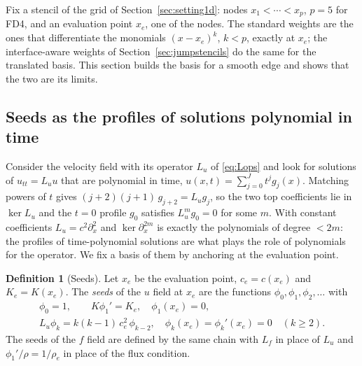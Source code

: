 \documentclass[11pt]{amsart}
\theoremstyle{definition}
\newtheorem{definition}[theorem]{Definition}
\theoremstyle{remark}
\newcommand{\Lu}{L_u}
\newcommand{\Lf}{L_f}
\newcommand{\px}{\partial_x}
\begin{document}
Fix a stencil of the grid of Section~\ref{sec:setting1d}: nodes
$x_1 < \cdots < x_p$, $p = 5$ for FD4, and an evaluation point $x_e$,
one of the nodes. The standard weights are the ones that differentiate
the monomials $(x - x_e)^k$, $k < p$, exactly at $x_e$; the
interface-aware weights of Section~\ref{sec:jumpstencils} do the same
for the translated basis. This section builds the basis for a smooth
edge and shows that the two are its limits.

\subsection{Seeds as the profiles of solutions polynomial in time}
\label{sec:chain}
Consider the velocity field with its operator $\Lu$ of \eqref{eq:Lops}
and look for solutions of $u_{tt} = \Lu u$ that are polynomial in time,
$u(x, t) = \sum_{j = 0}^{J} t^j g_j(x)$. Matching powers of $t$ gives
$(j + 2)(j + 1)\, g_{j+2} = \Lu g_j$, so the two top coefficients lie in
$\ker \Lu$ and the $t = 0$ profile $g_0$ satisfies $\Lu^m g_0 = 0$ for
some $m$. With constant coefficients $\Lu = c^2 \px^2$ and
$\ker \px^{2m}$ is exactly the polynomials of degree $< 2m$: the
profiles of time-polynomial solutions are what plays the role of
polynomials for the operator. We fix a basis of them by anchoring at the
evaluation point.

\begin{definition}[Seeds]
\label{def:seeds}
Let $x_e$ be the evaluation point, $c_e = c(x_e)$ and $K_e = K(x_e)$.
The \emph{seeds} of the $u$ field at $x_e$ are the functions
$\phi_0, \phi_1, \phi_2, \ldots$ with
\begin{equation}
  \label{eq:chain}
  \begin{gathered}
  \phi_0 = 1, \qquad K \phi_1' = K_e, \quad \phi_1(x_e) = 0, \\
  \Lu \phi_k = k (k - 1)\, c_e^2\, \phi_{k-2}, \quad
  \phi_k(x_e) = \phi_k'(x_e) = 0 \quad (k \ge 2).
  \end{gathered}
\end{equation}
The seeds of the $f$ field are defined by the same chain with $\Lf$ in
place of $\Lu$ and $\phi_1' / \rho = 1 / \rho_e$ in place of the flux
condition.
\end{definition}
\end{document}
